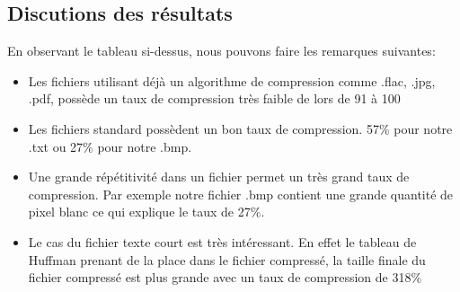\documentclass[a4paper,11pt]{article}
\begin{document}
\subsection*{Discutions des résultats}
En observant le tableau si-dessus, nous pouvons faire les remarques suivantes:
\begin{itemize}
\item Les fichiers utilisant déjà un algorithme de compression comme .flac, .jpg, .pdf, possède un taux de compression très faible de lors de 91 à 100%
\item Les fichiers standard possèdent un bon taux de compression. 57\% pour notre .txt ou 27\% pour notre .bmp.
\item Une grande répétitivité dans un fichier permet un très grand taux de compression. Par exemple notre fichier .bmp contient une grande quantité de pixel blanc ce qui explique le taux de 27\%.
\item Le cas du fichier texte court est très intéressant. En effet le tableau de Huffman prenant de la place dans le fichier compressé, la taille finale du fichier compressé est plus grande avec un taux de compression de 318\%
\end{itemize}
\end{document}
